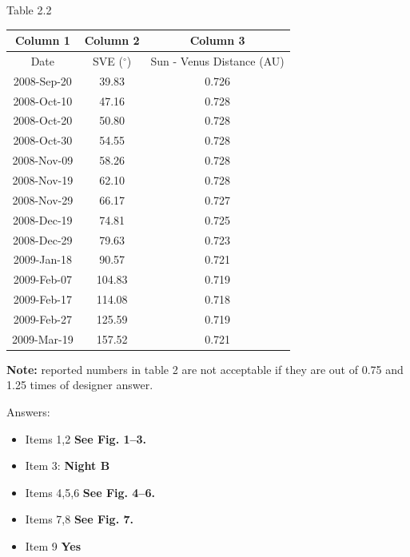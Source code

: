 \begin{center}
Table 2.2

\begin{tabular}{|c|c|c|}
\hline
Column 1 & Column 2 & Column 3\\
\hline
Date & SVE ($^\circ$) & Sun - Venus Distance (AU)\\
\hline
2008-Sep-20 & 39.83 & 0.726\\
\hline
2008-Oct-10 & 47.16 & 0.728\\
\hline
2008-Oct-20 & 50.80 & 0.728\\
\hline
2008-Oct-30 & 54.55 & 0.728\\
\hline
2008-Nov-09 & 58.26 & 0.728\\
\hline
2008-Nov-19 & 62.10 & 0.728\\
\hline
2008-Nov-29 & 66.17 & 0.727\\
\hline
2008-Dec-19 & 74.81 & 0.725\\
\hline
2008-Dec-29 & 79.63 & 0.723\\
\hline
2009-Jan-18 & 90.57 & 0.721\\
\hline
2009-Feb-07 & 104.83 & 0.719\\
\hline
2009-Feb-17 & 114.08 & 0.718\\
\hline
2009-Feb-27 & 125.59 & 0.719\\
\hline
2009-Mar-19 & 157.52 & 0.721\\
\hline
\end{tabular}
\end{center}

\textbf{Note:} reported numbers in table 2 are not acceptable if they are out of 0.75 and
1.25 times of designer answer.


Answers:
\begin{itemize}
\item Items 1,2 \textbf{See Fig. 1--3.}
\item Item 3: \textbf{Night B}
\item Items 4,5,6 \textbf{See Fig. 4--6.}
\item Items 7,8 \textbf{See Fig. 7.}
\item Item 9 \textbf{Yes}
\end{itemize}

